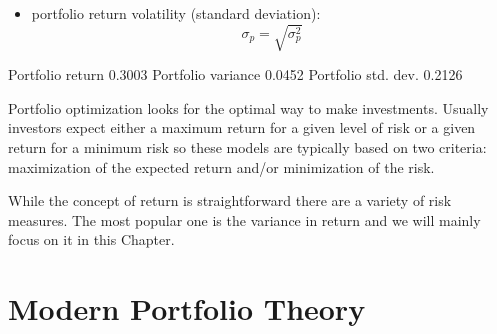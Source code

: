 \begin{itemize}
\begin{equation}
\begin{aligned}
\begin{bmatrix}
				w_1 & w_2 & \cdots & w_n
			\end{bmatrix} =\\
			&\begin{bmatrix}
				\sigma_{11} *w_1 + \sigma_{12} *w_2 + \cdots + \sigma_{1n}*w_n \\
				\sigma_{21} *w_1 + \sigma_{22} *w_2  +\cdots + \sigma_{2n}*w_n \\
				\vdots \\
				\sigma_{n1} *w_1 + \sigma_{n2}*w_2 + \cdots + \sigma_{nn}*w_n \\
			\end{bmatrix}
			\begin{bmatrix}
				w_1 & w_2 & \cdots & w_n
			\end{bmatrix}
		\end{aligned}
	\end{equation}
	where $\sigma_{ii}$ is the (sample) standard deviation of the periodic returns on an asset, and $\rho _{ij}$ is the correlation coefficient between the returns on assets $i$ and $j$. For a brief introduction to matrices see Chapter~\ref{sec:matrices};
	\item
	portfolio return volatility (standard deviation):
	\begin{equation}
		\sigma _{p}= \sqrt{\sigma _{p}^{2}}
	\end{equation}
\end{itemize}

\begin{ioutput}
Portfolio return 0.3003
Portfolio variance 0.0452
Portfolio std. dev. 0.2126
\end{ioutput}

Portfolio optimization looks for the optimal way to make investments. Usually investors expect either a maximum return for a given level of risk or a given return for a minimum risk so these models are typically based on two criteria: maximization of the expected return and/or minimization of the risk.

While the concept of return is straightforward there are a variety of risk measures. The most popular one is the variance in return and we will mainly focus on it in this Chapter.

\section{Modern Portfolio Theory}
\label{the-markowitz-meanvariance-portfolio-model}

